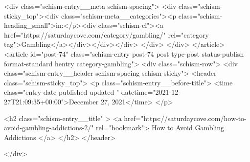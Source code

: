 {		<div class="schism-entry__meta schism-spacing">			<div class="schism-sticky_top"><div class="schism-meta__categories"><p class="schism-heading_small">in:</p><div class="schism-cl"><a href="https://saturdaycove.com/category/gambling/" rel="category tag">Gambling</a></div></div></div>		</div>
	</div>
</article>
<article id="post-74" class="schism-entry post-74 post type-post status-publish format-standard hentry category-gambling">
	<div class="schism-row">		<div class="schism-entry__header schism-spacing schism-sticky">			<header class="schism-sticky_top">				<p class="schism-entry__before-title">
					<time class="entry-date published updated " datetime="2021-12-27T21:09:35+00:00">December 27, 2021</time>				</p>

				<h2 class="schism-entry__title" >
					<a href="https://saturdaycove.com/how-to-avoid-gambling-addictions-2/" rel="bookmark">
						How to Avoid Gambling Addictions					</a>
				</h2>
			</header>

					</div>

}
